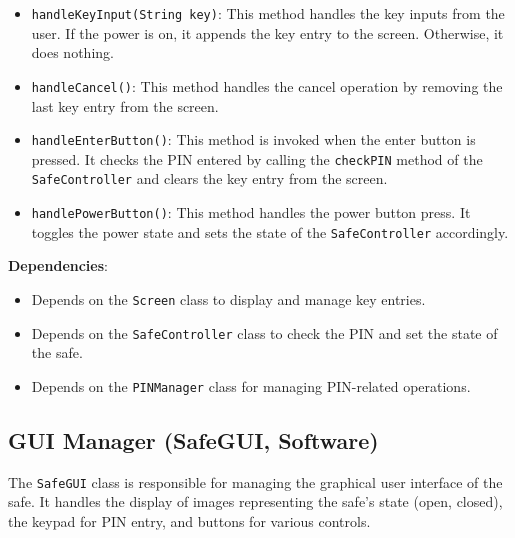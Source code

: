 \documentclass{article}
\begin{document}
\begin{itemize}
    \item \texttt{handleKeyInput(String key)}: This method handles the key inputs from the user. If the power is on, it appends the key entry to the screen. Otherwise, it does nothing.
    \item \texttt{handleCancel()}: This method handles the cancel operation by removing the last key entry from the screen.
    \item \texttt{handleEnterButton()}: This method is invoked when the enter button is pressed. It checks the PIN entered by calling the \texttt{checkPIN} method of the \texttt{SafeController} and clears the key entry from the screen.
    \item \texttt{handlePowerButton()}: This method handles the power button press. It toggles the power state and sets the state of the \texttt{SafeController} accordingly.
\end{itemize}
\textbf{Dependencies}:
\begin{itemize}
    \item Depends on the \texttt{Screen} class to display and manage key entries.
    \item Depends on the \texttt{SafeController} class to check the PIN and set the state of the safe.
    \item Depends on the \texttt{PINManager} class for managing PIN-related operations.
\end{itemize}

\subsection{GUI Manager (SafeGUI, Software)}
The \texttt{SafeGUI} class is responsible for managing the graphical user interface of the safe. It handles the display of images representing the safe's state (open, closed), the keypad for PIN entry, and buttons for various controls.
\end{document}
